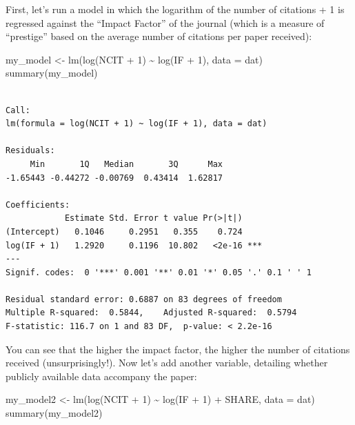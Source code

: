 \documentclass[
  letterpaper,
  DIV=11,
  numbers=noendperiod]{scrreprt}
\newenvironment{Shaded}{\begin{snugshade}}{\end{snugshade}}
\newcommand{\AttributeTok}[1]{\textcolor[rgb]{0.40,0.45,0.13}{#1}}
\newcommand{\DecValTok}[1]{\textcolor[rgb]{0.68,0.00,0.00}{#1}}
\newcommand{\FunctionTok}[1]{\textcolor[rgb]{0.28,0.35,0.67}{#1}}
\newcommand{\NormalTok}[1]{\textcolor[rgb]{0.00,0.23,0.31}{#1}}
\newcommand{\OtherTok}[1]{\textcolor[rgb]{0.00,0.23,0.31}{#1}}
\newcommand{\SpecialCharTok}[1]{\textcolor[rgb]{0.37,0.37,0.37}{#1}}
\begin{document}
First, let's run a model in which the logarithm of the number of
citations + 1 is regressed against the ``Impact Factor'' of the journal
(which is a measure of ``prestige'' based on the average number of
citations per paper received):

\begin{Shaded}
\begin{Highlighting}[]
\NormalTok{my\_model }\OtherTok{\textless{}{-}} \FunctionTok{lm}\NormalTok{(}\FunctionTok{log}\NormalTok{(NCIT }\SpecialCharTok{+} \DecValTok{1}\NormalTok{) }\SpecialCharTok{\textasciitilde{}} \FunctionTok{log}\NormalTok{(IF }\SpecialCharTok{+} \DecValTok{1}\NormalTok{), }\AttributeTok{data =}\NormalTok{ dat)}
\FunctionTok{summary}\NormalTok{(my\_model)}
\end{Highlighting}
\end{Shaded}

\begin{verbatim}

Call:
lm(formula = log(NCIT + 1) ~ log(IF + 1), data = dat)

Residuals:
     Min       1Q   Median       3Q      Max 
-1.65443 -0.44272 -0.00769  0.43414  1.62817 

Coefficients:
            Estimate Std. Error t value Pr(>|t|)    
(Intercept)   0.1046     0.2951   0.355    0.724    
log(IF + 1)   1.2920     0.1196  10.802   <2e-16 ***
---
Signif. codes:  0 '***' 0.001 '**' 0.01 '*' 0.05 '.' 0.1 ' ' 1

Residual standard error: 0.6887 on 83 degrees of freedom
Multiple R-squared:  0.5844,    Adjusted R-squared:  0.5794 
F-statistic: 116.7 on 1 and 83 DF,  p-value: < 2.2e-16
\end{verbatim}

You can see that the higher the impact factor, the higher the number of
citations received (unsurprisingly!). Now let's add another variable,
detailing whether publicly available data accompany the paper:

\begin{Shaded}
\begin{Highlighting}[]
\NormalTok{my\_model2 }\OtherTok{\textless{}{-}} \FunctionTok{lm}\NormalTok{(}\FunctionTok{log}\NormalTok{(NCIT }\SpecialCharTok{+} \DecValTok{1}\NormalTok{) }\SpecialCharTok{\textasciitilde{}} \FunctionTok{log}\NormalTok{(IF }\SpecialCharTok{+} \DecValTok{1}\NormalTok{) }\SpecialCharTok{+}\NormalTok{ SHARE, }\AttributeTok{data =}\NormalTok{ dat)}
\FunctionTok{summary}\NormalTok{(my\_model2)}
\end{Highlighting}
\end{Shaded}
\end{document}
